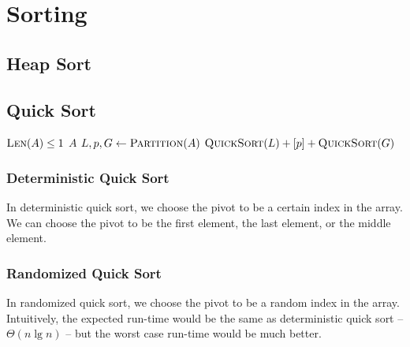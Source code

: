 \chapter{Sorting}

\section{Heap Sort}

\section{Quick Sort}

\begin{algorithm}[H] \begin{algorithmic}[1]
        \If $\textsc{Len}(A) \le 1$ 
            \State \Return $A$
        \EndIf
        \State $L, p, G \gets \textsc{Partition}(A)$
        \State \Return $\textsc{QuickSort}(L) + [p] + \textsc{QuickSort}(G)$
    \EndProcedure
\end{algorithmic} \end{algorithm}

\subsection{Deterministic Quick Sort}

In deterministic quick sort, we choose the pivot to be a certain index in the array. We can choose the pivot to be the first element, the last element, or the middle element. 


\subsection{Randomized Quick Sort}

In randomized quick sort, we choose the pivot to be a random index in the array. Intuitively, the expected run-time would be the same as deterministic quick sort -- $\Theta(n \lg n)$ -- but the worst case run-time would be much better.